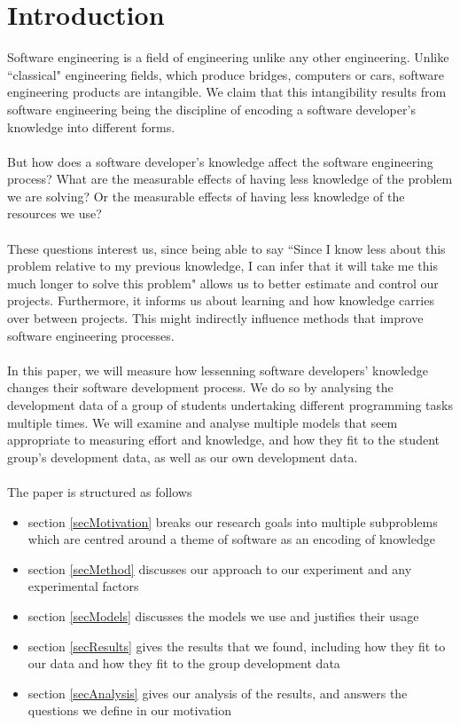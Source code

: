\section{Introduction} \label{secIntro}

Software engineering is a field of engineering unlike any other engineering.
Unlike ``classical" engineering fields, which produce bridges, computers or
cars, software engineering products are intangible.
We claim that this intangibility results from software engineering being the
discipline of encoding a software developer's knowledge into different forms.\\
\\
But how does a software developer's knowledge affect the software engineering
process?
What are the measurable effects of having less knowledge of the problem we are
solving?
Or the measurable effects of having less knowledge of the resources we use?\\
\\
These questions interest us, since being able to say ``Since I know less about
this problem relative to my previous knowledge, I can infer that it will take me
this much longer to solve this problem" allows us to better estimate and control
our projects.
Furthermore, it informs us about learning and how knowledge carries over between
projects.
This might indirectly influence methods that improve software engineering
processes.\\
\\
In this paper, we will measure how lessenning software developers' knowledge
changes their software development process.
We do so by analysing the development data of a group of students undertaking
different programming tasks multiple times.
We will examine and analyse multiple models that seem appropriate to
measuring effort and knowledge, and how they fit to the student group's development data,
as well as our own development data.\\
\\
The paper is structured as follows
\begin{itemize}
  \item section \ref{secMotivation} breaks our research goals
  into multiple subproblems which are centred around a theme of software as
  an encoding of knowledge
  \item section \ref{secMethod} discusses our approach to our experiment and
  any experimental factors
  \item section \ref{secModels} discusses the models we use and justifies their
  usage
  \item section \ref{secResults} gives the results that we found, including how
  they fit to our data and how they fit to the group development data
  \item section \ref{secAnalysis} gives our analysis of the results, and answers
  the questions we define in our motivation
\end{itemize}
